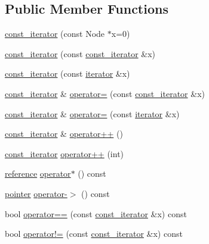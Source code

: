 \subsection*{Public Member Functions}
\begin{DoxyCompactItemize}
\item 
\hyperlink{classlist_1_1const__iterator_a2e4721f74e34760b176f69e2ae329d01}{const\_\-iterator} (const Node $\ast$x=0)
\item 
\hyperlink{classlist_1_1const__iterator_af5e29ae94aa5fd5d8f31cb64095de5b5}{const\_\-iterator} (const \hyperlink{classlist_1_1const__iterator}{const\_\-iterator} \&x)
\item 
\hyperlink{classlist_1_1const__iterator_a8741a68b72d63996e9cd0ccb23dbe43b}{const\_\-iterator} (const \hyperlink{classlist_1_1iterator}{iterator} \&x)
\item 
\hyperlink{classlist_1_1const__iterator}{const\_\-iterator} \& \hyperlink{classlist_1_1const__iterator_ad200a0dd9e9742557a850015ef981474}{operator=} (const \hyperlink{classlist_1_1const__iterator}{const\_\-iterator} \&x)
\item 
\hyperlink{classlist_1_1const__iterator}{const\_\-iterator} \& \hyperlink{classlist_1_1const__iterator_abae625ab29b9b8731e205f3ed9dea5ee}{operator=} (const \hyperlink{classlist_1_1iterator}{iterator} \&x)
\item 
\hyperlink{classlist_1_1const__iterator}{const\_\-iterator} \& \hyperlink{classlist_1_1const__iterator_a6c76fbbc124a174f63924602ab43a06b}{operator++} ()
\item 
\hyperlink{classlist_1_1const__iterator}{const\_\-iterator} \hyperlink{classlist_1_1const__iterator_a5f3554942c53d3367c553398624bd228}{operator++} (int)
\item 
\hyperlink{classlist_1_1const__iterator_ad4af4d92e40fe0a31c4a8911199aee89}{reference} \hyperlink{classlist_1_1const__iterator_a3df22c2ff30372d1a9c3f5188843c4f7}{operator$\ast$} () const 
\item 
\hyperlink{classlist_1_1const__iterator_a25945664ce22d7fb6211f0f8b84ed23f}{pointer} \hyperlink{classlist_1_1const__iterator_ab8891c556d2becef8b3c88800bc5fa98}{operator-\/$>$} () const 
\item 
bool \hyperlink{classlist_1_1const__iterator_a6d92272cc5993306633b1bb74dd7f348}{operator==} (const \hyperlink{classlist_1_1const__iterator}{const\_\-iterator} \&x) const 
\item 
bool \hyperlink{classlist_1_1const__iterator_a2721e2a07de7925c37bd91bf43b4485d}{operator!=} (const \hyperlink{classlist_1_1const__iterator}{const\_\-iterator} \&x) const 
\end{DoxyCompactItemize}
